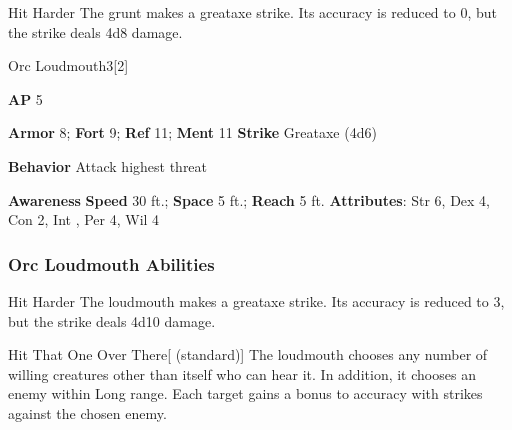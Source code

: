 \begin{freeability}{Hit Harder}
The grunt makes a greataxe strike.
Its accuracy is reduced to 0, but the strike deals 4d8 damage.
\end{freeability}

\begin{monsection}{Orc Loudmouth}{3}[2]
\vspace{-1em}\vspace{-1em}
\begin{spellcontent}
\begin{spelltargetinginfo}
{\textbf{AP} 5}

\pari \textbf{Armor} 8;
\textbf{Fort} 9;
\textbf{Ref} 11;
\textbf{Ment} 11
\pari \textbf{Strike} Greataxe  (4d6)



\pari \textbf{Behavior} Attack highest threat
\end{spelltargetinginfo}
\end{spellcontent}

\begin{monsterfooter}
\pari \textbf{Awareness} 
\pari \textbf{Speed} 30 ft.;
\textbf{Space} 5 ft.;
\textbf{Reach} 5 ft.
\pari \textbf{Attributes}:
Str 6,
Dex 4,
Con 2,
Int ,
Per 4,
Wil 4
\end{monsterfooter}
\end{monsection}


\subsubsection{Orc Loudmouth Abilities}

\begin{freeability}{Hit Harder}
The loudmouth makes a greataxe strike.
Its accuracy is reduced to 3, but the strike deals 4d10 damage.
\end{freeability}

\vspace{0.5em}
\begin{freeability}{Hit That One Over There}[ (standard)]
The loudmouth chooses any number of willing creatures other than itself who can hear it.
In addition, it chooses an enemy within Long range.
Each target gains a  bonus to accuracy with strikes against the chosen enemy.
\end{freeability}


